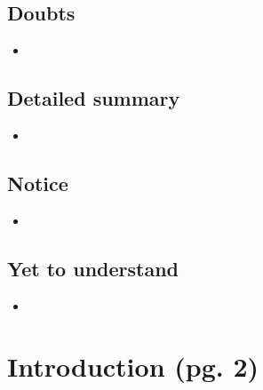 \documentclass{article}
\begin{document}
\subsection{Doubts}

    \begin{itemize}

    \item 
    
    \end{itemize}

\subsection{Detailed summary}

    \begin{itemize}

    \item 
    
    \end{itemize}

\subsection{Notice}

    \begin{itemize}

    \item 
    
    \end{itemize}

\subsection{Yet to understand}

    \begin{itemize}

    \item 
    
    \end{itemize}

\section{Introduction (pg. 2)}
\end{document}
